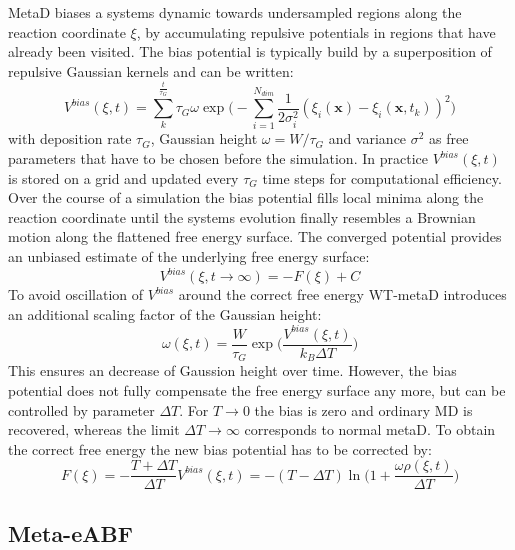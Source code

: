 MetaD biases a systems dynamic towards undersampled regions along the reaction coordinate $\xi$, by accumulating repulsive potentials in regions that have already been visited. The bias potential is typically build by a superposition of repulsive Gaussian kernels and can be written:\autocite{barducci2011metadynamics}
\begin{equation}
  V^{bias}(\xi,t)= \sum_{k}^{\frac{t}{\tau_G}} \tau_G \omega \exp\biggr(-\sum_{i=1}^{N_{dim}} \frac{1}{2\sigma_{i}^{2}} (\xi_{i}(\textbf{x})-\xi_{i}(\textbf{x},t_k))^2 \biggl)
\end{equation}
with deposition rate $\tau_G$, Gaussian height $\omega=W/\tau_G$ and variance $\sigma^2$ as free parameters that have to be chosen before the simulation. In practice $V^{bias}(\xi,t)$ is stored on a grid and updated every $\tau_G$ time steps for computational efficiency. Over the course of a simulation the bias potential fills local minima along the reaction coordinate until the systems evolution finally resembles a Brownian motion along the flattened free energy surface. The converged potential provides an unbiased estimate of the underlying free energy surface:
\begin{equation}
  V^{bias}(\xi, t \to \infty) = - F(\xi) + C
\end{equation}
To avoid oscillation of $V^{bias}$ around the correct free energy WT-metaD introduces an additional scaling factor of the Gaussian height:\autocite{barducci2008well}
\begin{equation}
  \omega(\xi,t) = \frac{W}{\tau_G}\exp\biggl(\frac{V^{bias}(\xi,t)}{k_B \Delta T} \biggr)
\end{equation}
This ensures an decrease of Gaussion height over time. However, the bias potential does not fully compensate the free energy surface any more, but can be controlled by parameter $\Delta T$. For $T \to 0$ the bias is zero and ordinary MD is recovered, whereas the limit $\Delta T \to \infty$ corresponds to normal metaD. To obtain the correct free energy the new bias potential has to be corrected by:
\begin{equation}
F(\xi) = -\frac{T+\Delta T}{\Delta T}V^{bias}(\xi, t) = -(T-\Delta T)\ln \biggl(1+\frac{\omega \rho(\xi, t)}{\Delta T} \biggr)
\end{equation}

\subsection{Meta-eABF}
